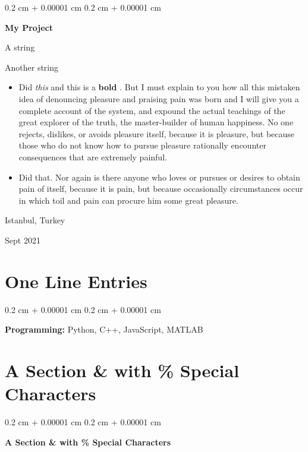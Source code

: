 \documentclass[10pt, letterpaper]{article}
\newenvironment{summary}{
    \begin{description}[
        topsep=0.10 cm,
        parsep=0.10 cm,
        partopsep=0pt,
        itemsep=0pt,
        leftmargin=0.4 cm + 10pt
    ]
}{
    \end{description}
} %
\newenvironment{highlights}{
    \begin{itemize}[
        topsep=0.10 cm,
        parsep=0.10 cm,
        partopsep=0pt,
        itemsep=0pt,
        leftmargin=0.4 cm + 10pt
    ]
}{
    \end{itemize}
} %
\newenvironment{onecolentry}{
    \begin{adjustwidth}{
        0.2 cm + 0.00001 cm
    }{
        0.2 cm + 0.00001 cm
    }
}{
    \end{adjustwidth}
} %
\newenvironment{twocolentry}[2][]{
    \onecolentry
    \def\secondColumn{#2}
    \setcolumnwidth{\fill, 4.5 cm}
    \begin{paracol}{2}
}{
    \switchcolumn \raggedleft \secondColumn
    \end{paracol}
    \endonecolentry
} %
\let\hrefWithoutArrow\href
\renewcommand{\href}[2]{\hrefWithoutArrow{#1}{\ifthenelse{\equal{#2}{}}{ }{#2 }\raisebox{.15ex}{\footnotesize \faExternalLink*}}}
\begin{document}
        \begin{twocolentry}{
            Istanbul, Turkey

        Sept 2021
        }
            \textbf{My Project}
            \begin{summary}
                \item A string
                \item Another string
            \end{summary}
            \begin{highlights}
                \item Did \textit{this} and this is a \textbf{bold} \href{https://example.com}{link}. But I must explain to you how all this mistaken idea of denouncing pleasure and praising pain was born and I will give you a complete account of the system, and expound the actual teachings of the great explorer of the truth, the master-builder of human happiness. No one rejects, dislikes, or avoids pleasure itself, because it is pleasure, but because those who do not know how to pursue pleasure rationally encounter consequences that are extremely painful.
                \item Did that. Nor again is there anyone who loves or pursues or desires to obtain pain of itself, because it is pain, but because occasionally circumstances occur in which toil and pain can procure him some great pleasure.
            \end{highlights}
        \end{twocolentry}



    
    \section{One Line Entries}



        
        \begin{onecolentry}
            \textbf{Pro\textnormal{gram}ming:} Python, C++, JavaScript, MATLAB
        \end{onecolentry}


    
    \section{A Section \& with \% Special Characters}



        
        \begin{onecolentry}
            \textbf{A Section \& with \% Special Characters}
        \end{onecolentry}



    
\end{document}

